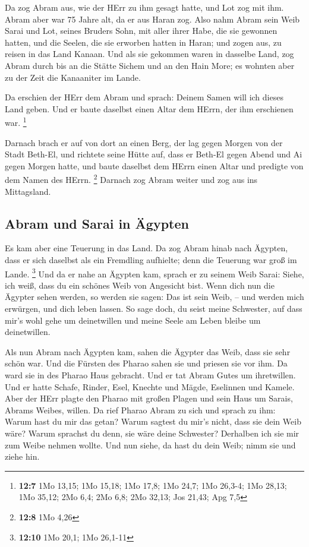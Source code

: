  Da zog Abram aus, wie der HErr zu ihm gesagt hatte, und
Lot zog mit ihm. Abram aber war 75 Jahre alt, da er aus Haran zog.
 Also nahm Abram sein Weib Sarai und Lot, seines Bruders
Sohn, mit aller ihrer Habe, die sie gewonnen hatten, und die Seelen, die
sie erworben hatten in Haran; und zogen aus, zu reisen in das Land
Kanaan. Und als sie gekommen waren in dasselbe Land,  zog
Abram durch bis an die Stätte Sichem und an den Hain More; es wohnten
aber zu der Zeit die Kanaaniter im Lande.

 Da erschien der HErr dem Abram und sprach: Deinem Samen
will ich dieses Land geben. Und er baute daselbst einen Altar dem HErrn,
der ihm erschienen war. \footnote{\textbf{12:7} 1Mo 13,15; 1Mo 15,18;
  1Mo 17,8; 1Mo 24,7; 1Mo 26,3-4; 1Mo 28,13; 1Mo 35,12; 2Mo 6,4; 2Mo
  6,8; 2Mo 32,13; Jos 21,43; Apg 7,5}

 Darnach brach er auf von dort an einen Berg, der lag
gegen Morgen von der Stadt Beth-El, und richtete seine Hütte auf, dass
er Beth-El gegen Abend und Ai gegen Morgen hatte, und baute daselbst dem
HErrn einen Altar und predigte von dem Namen des HErrn. \footnote{\textbf{12:8}
  1Mo 4,26}  Darnach zog Abram weiter und zog aus ins
Mittagsland.

\hypertarget{abram-und-sarai-in-uxe4gypten}{%
\subsection{Abram und Sarai in
Ägypten}\label{abram-und-sarai-in-uxe4gypten}}

 Es kam aber eine Teuerung in das Land. Da zog Abram
hinab nach Ägypten, dass er sich daselbst als ein Fremdling aufhielte;
denn die Teuerung war groß im Lande. \footnote{\textbf{12:10} 1Mo 20,1;
  1Mo 26,1-11}  Und da er nahe an Ägypten kam, sprach er
zu seinem Weib Sarai: Siehe, ich weiß, dass du ein schönes Weib von
Angesicht bist.  Wenn dich nun die Ägypter sehen werden,
so werden sie sagen: Das ist sein Weib, -- und werden mich erwürgen, und
dich leben lassen.  So sage doch, du seist meine
Schwester, auf dass mir's wohl gehe um deinetwillen und meine Seele am
Leben bleibe um deinetwillen.

 Als nun Abram nach Ägypten kam, sahen die Ägypter das
Weib, dass sie sehr schön war.  Und die Fürsten des
Pharao sahen sie und priesen sie vor ihm. Da ward sie in des Pharao Haus
gebracht.  Und er tat Abram Gutes um ihretwillen. Und er
hatte Schafe, Rinder, Esel, Knechte und Mägde, Eselinnen und Kamele.
 Aber der HErr plagte den Pharao mit großen Plagen und
sein Haus um Sarais, Abrams Weibes, willen.  Da rief
Pharao Abram zu sich und sprach zu ihm: Warum hast du mir das getan?
Warum sagtest du mir's nicht, dass sie dein Weib wäre? 
Warum sprachst du denn, sie wäre deine Schwester? Derhalben ich sie mir
zum Weibe nehmen wollte. Und nun siehe, da hast du dein Weib; nimm sie
und ziehe hin.

